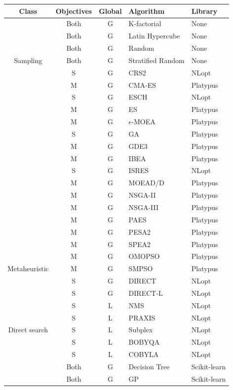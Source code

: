 \begin{table}[]
	\centering
	\begin{tabular}{cccll}
		\rowcolor[HTML]{EFEFEF} 
		\textbf{Class} & \textbf{Objectives} & \textbf{Global} & \textbf{Algorithm} & \textbf{Library} \\ \hline
		& Both & G & K-factorial & None \\
		& Both & G & Latin Hypercube & None \\
		& Both & G & Random & None \\
		\multirow{-4}{*}{Sampling} & Both & G & Stratified Random & None \\ \hline
		& S & G & CRS2 & NLopt \\
		& M & G & CMA-ES & Platypus \\
		& S & G & ESCH & NLopt \\
		& M & G & ES & Platypus \\
		& M & G & $\epsilon$-MOEA & Platypus \\
		& S & G & GA & Platypus \\
		& M & G & GDE3 & Platypus \\
		& M & G & IBEA & Platypus \\
		& S & G & ISRES & NLopt \\
		& M & G & MOEAD/D & Platypus \\
		& M & G & NSGA-II & Platypus \\
		& M & G & NSGA-III & Platypus \\
		& M & G & PAES & Platypus \\
		& M & G & PESA2 & Platypus \\
		& M & G & SPEA2 & Platypus \\
		& M & G & OMOPSO & Platypus \\
		\multirow{-17}{*}{Metaheuristic} & M & G & SMPSO & Platypus \\ \hline
		& S & G & DIRECT & NLopt \\
		& S & G & DIRECT-L & NLopt \\
		& S & L & NMS & NLopt \\
		& S & L & PRAXIS & NLopt \\
		\multirow{-5}{*}{Direct search} & S & L & Subplex & NLopt \\ \hline
		& S & L & BOBYQA & NLopt \\
		& S & L & COBYLA & NLopt \\
		& Both & G & Decision Tree & Scikit-learn \\
		& Both & G & GP & Scikit-learn \\

\end{tabular}
\end{table}
